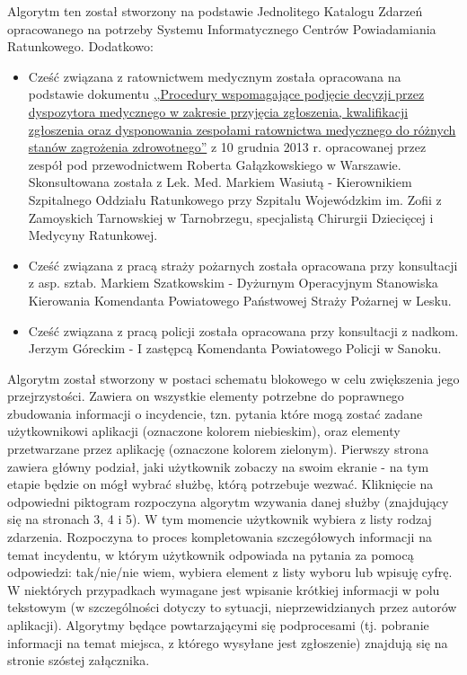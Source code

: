 \documentclass[a4paper]{article}
\begin{document}
	Algorytm ten został stworzony na podstawie Jednolitego Katalogu Zdarzeń opracowanego na potrzeby Systemu Informatycznego Centrów Powiadamiania Ratunkowego. Dodatkowo:
	\begin{itemize}
		\item Cześć związana z ratownictwem medycznym została opracowana na podstawie dokumentu \href{http://ratunek24.pl/media/upload/Procedury\%20dla\%20dyspozytor\%C3\%B3w\%20medycznych.pdf}{,,Procedury wspomagające podjęcie decyzji przez dyspozytora medycznego w zakresie przyjęcia zgłoszenia, kwalifikacji zgłoszenia oraz dysponowania zespołami ratownictwa medycznego do różnych stanów zagrożenia zdrowotnego''} z 10 grudnia 2013 r. opracowanej przez zespół pod przewodnictwem Roberta Gałązkowskiego w Warszawie. Skonsultowana została z Lek. Med. Markiem Wasiutą - Kierownikiem Szpitalnego Oddziału Ratunkowego przy Szpitalu Wojewódzkim im. Zofii z Zamoyskich Tarnowskiej w Tarnobrzegu, specjalistą Chirurgii Dziecięcej i Medycyny Ratunkowej.
		\item Cześć związana z pracą straży pożarnych została opracowana przy konsultacji z asp. sztab. Markiem Szatkowskim - Dyżurnym Operacyjnym Stanowiska Kierowania Komendanta Powiatowego Państwowej Straży Pożarnej w Lesku.
		\item Cześć związana z pracą policji została opracowana przy konsultacji z nadkom. Jerzym Góreckim - I zastępcą Komendanta Powiatowego Policji w Sanoku. 
	\end{itemize}
	
	\noindent Algorytm został stworzony w postaci schematu blokowego w celu zwiększenia jego przejrzystości. Zawiera on wszystkie elementy potrzebne do poprawnego zbudowania informacji o incydencie, tzn. pytania które mogą zostać zadane użytkownikowi aplikacji (oznaczone kolorem niebieskim), oraz elementy przetwarzane przez aplikację (oznaczone kolorem zielonym). Pierwszy strona zawiera główny podział, jaki użytkownik zobaczy na swoim ekranie - na tym etapie będzie on mógł wybrać służbę, którą potrzebuje wezwać. Kliknięcie na odpowiedni piktogram rozpoczyna algorytm wzywania danej służby (znajdujący się na stronach 3, 4 i 5). W tym momencie użytkownik wybiera z listy rodzaj zdarzenia. Rozpoczyna to proces kompletowania szczegółowych informacji na temat incydentu, w którym użytkownik odpowiada na pytania za pomocą odpowiedzi: tak/nie/nie wiem, wybiera element z listy wyboru lub wpisuję cyfrę. W niektórych przypadkach wymagane jest wpisanie krótkiej informacji w polu tekstowym (w szczególności dotyczy to sytuacji, nieprzewidzianych przez autorów aplikacji). Algorytmy będące powtarzającymi się podprocesami (tj. pobranie informacji na temat miejsca, z którego wysyłane jest zgłoszenie) znajdują się na stronie szóstej załącznika. 
	
\end{document}
